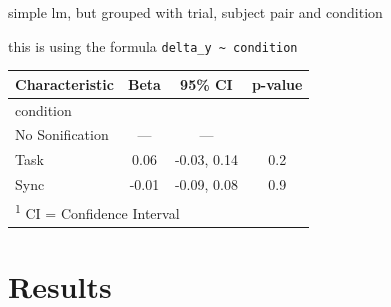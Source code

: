 \documentclass[10pt,a4paper,onecolumn]{article}
\begin{document}
simple lm, but grouped with trial, subject pair and condition

this is using the formula \texttt{delta\_y\ \textasciitilde{}\ condition}

\begin{table}
\centering\begingroup\fontsize{7}{9}\selectfont

\begin{tabular}{l|c|c|c}
\hline
\textbf{Characteristic} & \textbf{Beta} & \textbf{95\% CI} & \textbf{p-value}\\
\hline
condition &  &  & \\
\hline
\hspace{1em}No Sonification & — & — & \\
\hline
\hspace{1em}Task & 0.06 & -0.03, 0.14 & 0.2\\
\hline
\hspace{1em}Sync & -0.01 & -0.09, 0.08 & 0.9\\
\hline
\multicolumn{4}{l}{\rule{0pt}{1em}\textsuperscript{1} CI = Confidence Interval}\\
\end{tabular}
\endgroup{}
\end{table}

\hypertarget{results-1}{%
\section{Results}\label{results-1}}
\balance
\clearpage


\printbibliography[title=References,heading=bibintoc]
\end{document}
